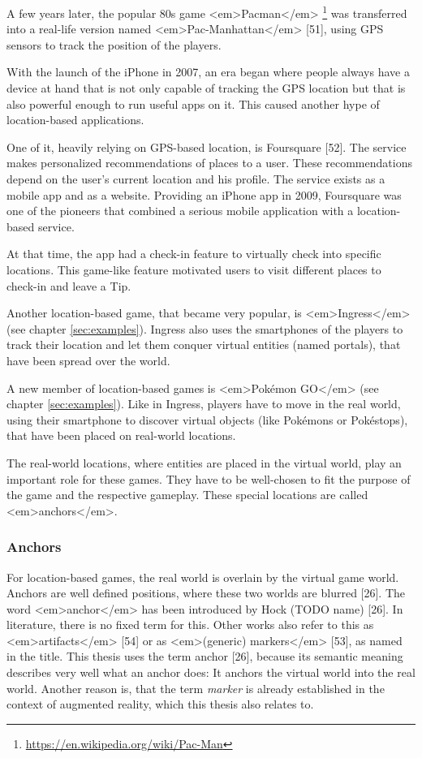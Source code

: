 A few years later, the popular 80s game <em>Pacman</em> \footnote{\url{https://en.wikipedia.org/wiki/Pac-Man}} was transferred into a real-life version named <em>Pac-Manhattan</em> [51], using GPS sensors to track the position of the players.

With the launch of the iPhone in 2007, an era began where people always have a device at hand that is not only capable of tracking the GPS location but that is also powerful enough to run useful apps on it. This caused another hype of location-based applications.

One of it, heavily relying on GPS-based location, is Foursquare [52]. The service makes personalized recommendations of places to a user. These recommendations depend on the user’s current location and his profile. The service exists as a mobile app and as a website. Providing an iPhone app in 2009, Foursquare was one of the pioneers that combined a serious mobile application with a location-based service.

At that time, the app had a check-in feature to virtually check into specific locations. This game-like feature motivated users to visit different places to check-in and leave a Tip.

Another location-based game, that became very popular, is <em>Ingress</em> (see chapter \ref{sec:examples}). Ingress also uses the smartphones of the players to track their location and let them conquer virtual entities (named portals), that have been spread over the world.

A new member of location-based games is <em>Pokémon GO</em> (see chapter \ref{sec:examples}). Like in Ingress, players have to move in the real world, using their smartphone to discover virtual objects (like Pokémons or Pokéstops), that have been placed on real-world locations.

The real-world locations, where entities are placed in the virtual world, play an important role for these games. They have to be well-chosen to fit the purpose of the game and the respective gameplay. These special locations are called <em>anchors</em>.

\subsubsection{Anchors}
For location-based games, the real world is overlain by the virtual game world. Anchors are well defined positions, where these two worlds are blurred [26]. The word <em>anchor</em> has been introduced by Hock (TODO name) [26]. In literature, there is no fixed term for this. Other works also refer to this as <em>artifacts</em> [54] or as <em>(generic) markers</em> [53], as named in the title. This thesis uses the term anchor [26], because its semantic meaning describes very well what an anchor does: It anchors the virtual world into the real world. Another reason is, that the term \emph{marker} is already established in the context of augmented reality, which this thesis also relates to.

